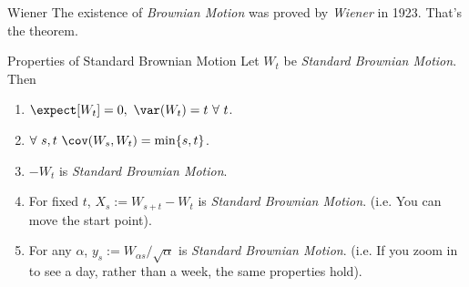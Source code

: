 \documentclass[11pt,a4paper]{article}
\begin{document}
  \begin{theorem}{Wiener}
    The existence of \textit{Brownian Motion} was proved by \textit{Wiener} in 1923. That's the theorem.
  \end{theorem}

  \begin{proposition}{Properties of Standard Brownian Motion}\label{pro_properties_of_standard_brownian_motion}
    Let $W_t$ be \textit{Standard Brownian Motion}. Then
    \begin{enumerate}
      \item $\expect[W_t]=0,\ \var(W_t)=t\ \forall\ t$.
      \item $\forall\ s,t\ \cov(W_s,W_t)=\min\{s,t\}$.
      \item $-W_t$ is \textit{Standard Brownian Motion}.
      \item For fixed $t$, $X_s:=W_{s+t}-W_t$ is \textit{Standard Brownian Motion}. (i.e. You can move the start point).
      \item For any $\alpha$, $y_s:=W_{\alpha s}/\sqrt\alpha$ is \textit{Standard Brownian Motion}. (i.e. If you zoom in to see a day, rather than a week, the same properties hold).
    \end{enumerate}
  \end{proposition}
\end{document}
